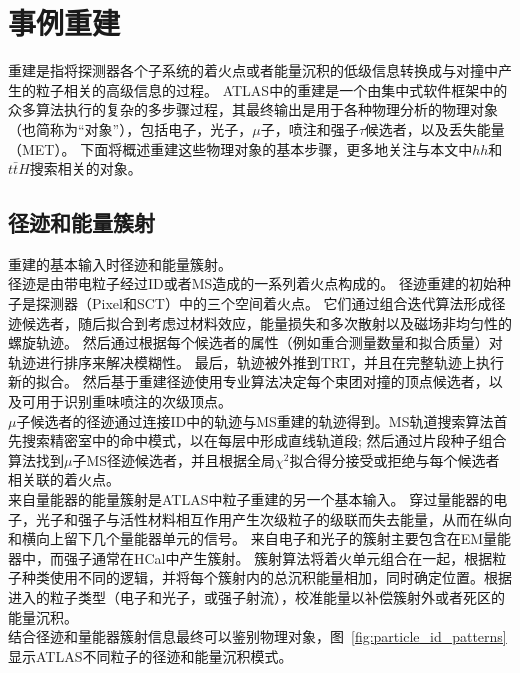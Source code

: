 \section{事例重建}\label{sec:evt_reco}
重建是指将探测器各个子系统的着火点或者能量沉积的低级信息转换成与对撞中产生的粒子相关的高级信息的过程。
ATLAS中的重建是一个由集中式软件框架中的众多算法执行的复杂的多步骤过程\cite{Calafiura:2005zz}，其最终输出是用于各种物理分析的物理对象（也简称为“对象”），包括电子，光子，$\mu$子，喷注和强子$\tau$候选者，以及丢失能量（MET）。 下面将概述重建这些物理对象的基本步骤，更多地关注与本文中$hh$和$t\bar{t}H$搜索相关的对象。

\subsection{径迹和能量簇射}
重建的基本输入时径迹和能量簇射。\\
径迹是由带电粒子经过ID或者MS造成的一系列着火点构成的。
径迹重建\cite{Cornelissen:1020106}的初始种子是探测器（Pixel和SCT）中的三个空间着火点。
它们通过组合迭代算法形成径迹候选者，随后拟合到考虑过材料效应，能量损失和多次散射以及磁场非均匀性的螺旋轨迹\cite{Cornelissen_2008}。
然后通过根据每个候选者的属性（例如重合测量数量和拟合质量）对轨迹进行排序来解决模糊性。 最后，轨迹被外推到TRT，并且在完整轨迹上执行新的拟合。
然后基于重建径迹使用专业算法\cite{Piacquadio_2008}决定每个束团对撞的顶点候选者，以及可用于识别重味喷注的次级顶点。\\
$\mu$子候选者的径迹通过连接ID中的轨迹与MS重建的轨迹得到。MS轨道搜索算法\cite{Benekos_2008}首先搜索精密室中的命中模式，以在每层中形成直线轨道段;
然后通过片段种子组合算法找到$\mu$子MS径迹候选者，并且根据全局$\chi^{2}$拟合得分接受或拒绝与每个候选者相关联的着火点。\\
来自量能器的能量簇射是ATLAS中粒子重建的另一个基本输入。 
穿过量能器的电子，光子和强子与活性材料相互作用产生次级粒子的级联而失去能量，从而在纵向和横向上留下几个量能器单元的信号。 来自电子和光子的簇射主要包含在EM量能器中，而强子通常在HCal中产生簇射。
簇射算法\cite{Lampl:1099735}将着火单元组合在一起，根据粒子种类使用不同的逻辑，并将每个簇射内的总沉积能量相加，同时确定位置。根据进入的粒子类型（电子和光子，或强子射流），校准能量以补偿簇射外或者死区的能量沉积。\\
结合径迹和量能器簇射信息最终可以鉴别物理对象，图~\ref{fig:particle_id_patterns}显示ATLAS不同粒子的径迹和能量沉积模式。
